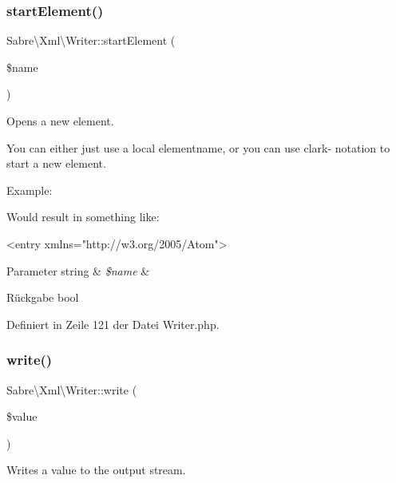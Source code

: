\subsubsection{\texorpdfstring{start\+Element()}{startElement()}}
{\footnotesize\ttfamily Sabre\textbackslash{}\+Xml\textbackslash{}\+Writer\+::start\+Element (\begin{DoxyParamCaption}\item[{}]{\$name }\end{DoxyParamCaption})}

Opens a new element.

You can either just use a local elementname, or you can use clark-\/ notation to start a new element.

Example\+: 


Would result in something like\+: \begin{DoxyVerb}<entry xmlns="http://w3.org/2005/Atom">
\end{DoxyVerb}



\begin{DoxyParams}[1]{Parameter}
string & {\em \$name} & \\
\hline
\end{DoxyParams}
\begin{DoxyReturn}{Rückgabe}
bool 
\end{DoxyReturn}


Definiert in Zeile 121 der Datei Writer.\+php.

\mbox{\label{class_sabre_1_1_xml_1_1_writer_a7ae8afe73ac4ca8d34a609b6ac16da5e}} 
\subsubsection{\texorpdfstring{write()}{write()}}
{\footnotesize\ttfamily Sabre\textbackslash{}\+Xml\textbackslash{}\+Writer\+::write (\begin{DoxyParamCaption}\item[{}]{\$value }\end{DoxyParamCaption})}

Writes a value to the output stream.

